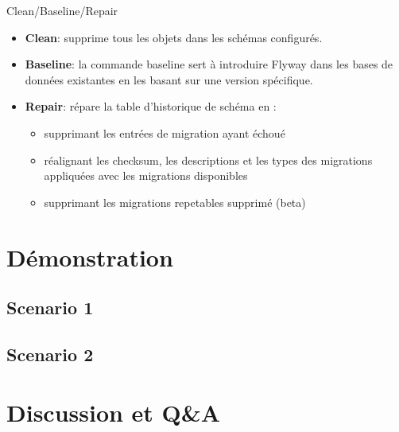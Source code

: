 \documentclass[slidestop,compress,11pt,xcolor=dvipsnames,french]{beamer}
\begin{document}
\begin{frame}{Clean/Baseline/Repair}
\vspace{1cm}
\begin{itemize}
 \item \textbf{Clean}: supprime tous les objets dans les schémas configurés.
 \item \textbf{Baseline}: la commande baseline sert à introduire Flyway dans les bases de données existantes en les basant sur une version spécifique.
 \item \textbf{Repair}: répare la table d'historique de schéma en :
    \begin{itemize}
        \item supprimant les entrées de migration ayant échoué
        \item réalignant les checksum, les descriptions et les types des migrations appliquées avec les migrations disponibles
        \item supprimant les migrations repetables supprimé (beta)
    \end{itemize}
\end{itemize}
\end{frame}

\section[Démo]{Démonstration}
\subsection*{Scenario 1}
\begin{frame}
\end{frame}
\subsection*{Scenario 2}
\begin{frame}
\end{frame}

\section[Discussion]{Discussion et Q\&A}
\end{document}

